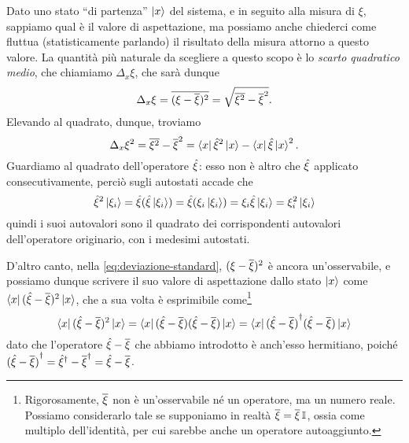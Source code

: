 Dato uno stato ``di partenza'' $\left|{x}\right\rangle$ del sistema, e in seguito alla misura di $\xi$, sappiamo qual è il valore di aspettazione, ma possiamo anche chiederci come fluttua (statisticamente parlando) il risultato della misura attorno a questo valore.
La quantità più naturale da scegliere a questo scopo è lo \emph{scarto quadratico medio}, che chiamiamo $\Delta_x\xi$, che sarà dunque
\begin{equation}
	\Delta_x\xi=\overline{(\xi-\overline{\xi})^2}=\sqrt{\overline{\xi^2}-\overline{\xi}^2}.
	\label{eq:deviazione-standard}
\end{equation}
Elevando al quadrato, dunque, troviamo
\begin{equation}
	\Delta_x\xi^2=\overline{\xi^2}-\overline{\xi}^2=\left\langle{x}\right|\hat{\xi}^2\left|{x}\right\rangle-\left\langle{x}\right|\hat{\xi}\left|{x}\right\rangle^2.
	\label{eq:varianza}
\end{equation}
Guardiamo al quadrato dell'operatore $\hat{\xi}$: esso non è altro che $\hat{\xi}$ applicato consecutivamente, perciò sugli autostati accade che
\begin{equation}
	\hat{\xi}^2\left|{\xi_i}\right\rangle=\hat{\xi}(\hat{\xi}\left|{\xi_i}\right\rangle)=\hat{\xi}(\xi_i\left|{\xi_i}\right\rangle)=\xi_i\hat{\xi}\left|{\xi_i}\right\rangle=\xi_i^2\left|{\xi_i}\right\rangle
\end{equation}
quindi i suoi autovalori sono il quadrato dei corrispondenti autovalori dell'operatore originario, con i medesimi autostati.

D'altro canto, nella \eqref{eq:deviazione-standard}, $(\xi-\overline{\xi})^2$ è ancora un'osservabile, e possiamo dunque scrivere il suo valore di aspettazione dallo stato $\left|{x}\right\rangle$ come $\left\langle{x}\right|(\hat{\xi}-\overline{\xi})^2\left|{x}\right\rangle$, che a sua volta è esprimibile come\footnote{Rigorosamente, $\overline{\xi}$ non è un'osservabile n\'e un operatore, ma un numero reale. Possiamo considerarlo tale se supponiamo in realtà $\overline{\xi}=\overline{\xi}\operatorname{\mathbb{I}}$, ossia come multiplo dell'identità, per cui sarebbe anche un operatore autoaggiunto.}
\begin{equation}
	\left\langle{x}\right|(\hat{\xi}-\overline{\xi})^2\left|{x}\right\rangle=\left\langle{x}\right|(\hat{\xi}-\overline{\xi})(\hat{\xi}-\overline{\xi})\left|{x}\right\rangle=\left\langle{x}\right|{(\hat{\xi}-\overline{\xi})}^\dagger(\hat{\xi}-\overline{\xi})\left|{x}\right\rangle
\end{equation}
dato che l'operatore $\hat{\xi}-\overline{\xi}$ che abbiamo introdotto è anch'esso hermitiano, poich\'e ${(\hat{\xi}-\overline{\xi})}^\dagger={\hat{\xi}}^\dagger-{\overline{\xi}}^\dagger=\hat{\xi}-\overline{\xi}$.

